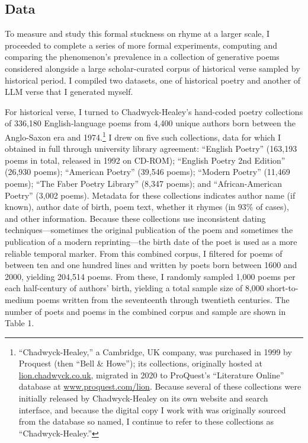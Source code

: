 \documentclass{simple-humanities}         %
\begin{document}
\subsection{Data}

To measure and study this formal stuckness on rhyme at a larger scale, I proceeded to complete a series of more formal experiments, computing and comparing the phenomenon's prevalence in a collection of generative poems considered alongside a large scholar-curated corpus of historical verse sampled by historical period.
I compiled two datasets, one of historical poetry and another of LLM verse that I generated myself.

For historical verse, I turned to Chadwyck-Healey's hand-coded poetry collections of 336,180 English-language poems from 4,400 unique authors born between the Anglo-Saxon era and 1974.\footnote{``Chadwyck-Healey,'' a Cambridge, UK company, was purchased in 1999 by Proquest (then ``Bell \& Howe''); its collections, originally hosted at \url{lion.chadwyck.co.uk}, migrated in 2020 to ProQuest's ``Literature Online'' database at \url{www.proquest.com/lion}. Because several of these collections were initially released by Chadwyck-Healey on its own website and search interface, and because the digital copy I work with was originally sourced from the database so named, I continue to refer to these collections as ``Chadwyck-Healey.''}
I drew on five such collections, data for which I obtained in full through university library agreement: ``English Poetry'' (163,193 poems in total, released  in 1992 on CD-ROM); ``English Poetry 2nd Edition'' (26,930 poems); ``American Poetry'' (39,546 poems); ``Modern Poetry'' (11,469 poems); ``The Faber Poetry Library'' (8,347 poems); and ``African-American Poetry'' (3,002 poems).
Metadata for these collections indicates author name (if known), author date of birth, poem text, whether it rhymes (in 93\% of cases), and other information.
Because these collections use inconsistent dating techniques---sometimes the original publication of the poem and sometimes the publication of a modern reprinting---the birth date of the poet is used as a more reliable temporal marker.
From this combined corpus, I filtered for poems of between ten and one hundred lines and written by poets born between 1600 and 2000, yielding 204,514 poems.
From these, I randomly sampled 1,000 poems per each half-century of authors' birth, yielding a total sample size of 8,000 short-to-medium poems written from the seventeenth through twentieth centuries.
The number of poets and poems in the combined corpus and sample are shown in Table 1.
\end{document}
